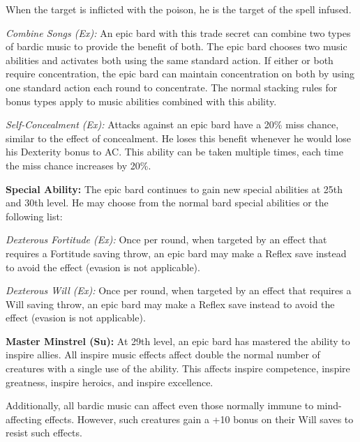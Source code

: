 When the target is inflicted with the poison, he is the target of the spell infused.

\textit{Combine Songs (Ex):} An epic bard with this trade secret can combine two types of bardic music to provide the benefit of both. The epic bard chooses two music abilities and activates both using the same standard action. If either or both require concentration, the epic bard can maintain concentration on both by using one standard action each round to concentrate. The normal stacking rules for bonus types apply to music abilities combined with this ability.


\textit{Self-Concealment (Ex):} Attacks against an epic bard have a 20\% miss chance, similar to the effect of concealment. He loses this benefit whenever he would lose his Dexterity bonus to AC. This ability can be taken multiple times, each time the miss chance increases by 20\%.


\textbf{Special Ability:} The epic bard continues to gain new special abilities at 25th and 30th level. He may choose from the normal bard special abilities or the following list:

\textit{Dexterous Fortitude (Ex):} Once per round, when targeted by an effect that requires a Fortitude saving throw, an epic bard may make a Reflex save instead to avoid the effect (evasion is not applicable).

\textit{Dexterous Will (Ex):} Once per round, when targeted by an effect that requires a Will saving throw, an epic bard may make a Reflex save instead to avoid the effect (evasion is not applicable).

\textbf{Master Minstrel (Su):} At 29th level, an epic bard has mastered the ability to inspire allies. All inspire music effects affect double the normal number of creatures with a single use of the ability. This affects inspire competence, inspire greatness, inspire heroics, and inspire excellence.

Additionally, all bardic music can affect even those normally immune to mind-affecting effects. However, such creatures gain a +10 bonus on their Will saves to resist such effects.
